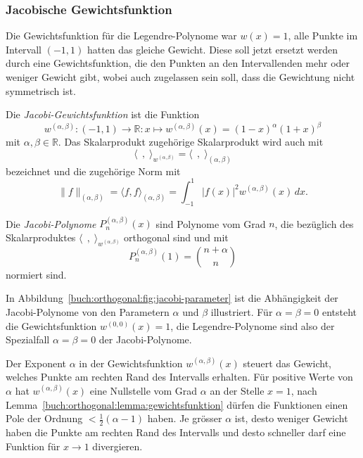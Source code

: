 %
%
\subsubsection{Jacobische Gewichtsfunktion}
Die Gewichtsfunktion für die Legendre-Polynome war $w(x)=1$, alle
Punkte im Intervall $(-1,1)$ hatten das gleiche Gewicht.
Diese soll jetzt ersetzt werden durch eine Gewichtsfunktion, die
den Punkten an den Intervallenden mehr oder weniger Gewicht gibt,
wobei auch zugelassen sein soll, dass die Gewichtung nicht symmetrisch
ist.

\begin{definition}
\label{buch:orthogonal:def:jacobi-gewichtsfunktion}
Die {\em Jacobi-Gewichtsfunktion} ist die Funktion
%
\[
w^{(\alpha,\beta)}
\colon (-1,1)\to\mathbb{R}
:
x\mapsto w^{(\alpha,\beta)}(x) = (1-x)^\alpha(1+x)^\beta
\]
mit $\alpha,\beta\in\mathbb{R}$.
%
Das Skalarprodukt zugehörige Skalarprodukt wird auch mit
\[
\langle\,\;,\;\rangle_{w^{(\alpha,\beta)}}
=
\langle\,\;,\;\rangle_{(\alpha,\beta)}
\]
%
bezeichnet und die zugehörige Norm mit
\[
\|f\|_{(\alpha,\beta)}
=
\langle f,f\rangle_{(\alpha,\beta)}
=
\int_{-1}^1 |f(x)|^2 w^{(\alpha,\beta)}(x)\,dx.
\]
\end{definition}

\begin{definition}
\label{buch:orthogonal:def:jacobi-polynome}
Die {\em Jacobi-Polynome} $P^{(\alpha,\beta)}_n(x)$ sind 
%
Polynome vom Grad $n$, die bezüglich des Skalarproduktes
$\langle\,\;,\;\rangle_{w^{(\alpha,\beta)}}$ orthogonal sind
und mit
\[
P_n^{(\alpha,\beta)}(1) = \binom{n+\alpha}n
\]
normiert sind.
\end{definition}

In Abbildung~\ref{buch:orthogonal:fig:jacobi-parameter}
ist die Abhängigkeit der Jacobi-Polynome von den Parametern $\alpha$
und $\beta$ illustriert.
Für $\alpha=\beta=0$ entsteht die Gewichtsfunktion
$w^{(0,0)}(x)=1$, die Legendre-Polynome sind also der Spezialfall
$\alpha=\beta=0$ der Jacobi-Polynome.

Der Exponent $\alpha$ in der Gewichtsfunktion $w^{(\alpha,\beta)}(x)$
steuert das Gewicht, welches Punkte am rechten Rand des Intervalls
erhalten.
Für positive Werte von $\alpha$ hat $w^{(\alpha,\beta)}(x)$ eine
Nullstelle vom Grad $\alpha$ an der Stelle $x=1$, nach
Lemma~\ref{buch:orthogonal:lemma:gewichtsfunktion}
dürfen die Funktionen einen Pole der Ordnung $<\frac12(\alpha-1)$ haben.
Je grösser $\alpha$ ist, desto weniger Gewicht haben die Punkte
am rechten Rand des Intervalls und desto schneller darf eine Funktion
für $x\to 1$ divergieren.

